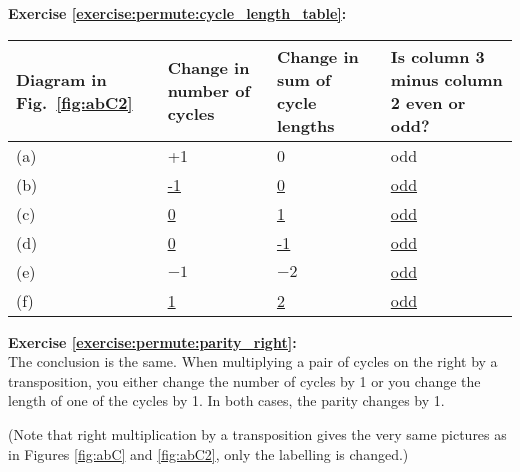 \noindent\textbf{Exercise  \ref{exercise:permute:cycle_length_table}:}
\begin{table}[!htb]
\begin{tabular}{|p{1.6cm}|p{2.7cm}|p{2.7cm}|p{3.5cm}|}
\hline 
\rule{0pt}{2.6ex} Diagram in Fig.~\ref{fig:abC2}&  Change in number of cycles   & Change in sum of cycle lengths & Is column 3 minus column 2 even or odd?  \rule[-1.2ex]{0pt}{0pt} \tabularnewline
\hline
\hline 
\rule{0pt}{2.6ex} (a)  &  +1  & 0  & odd \rule[-1.2ex]{0pt}{0pt} \tabularnewline
\hline 
\rule{0pt}{2.6ex} (b)  &  \underline{-1} & \underline{0} & \underline{odd} \rule[-1.2ex]{0pt}{0pt} \tabularnewline
\hline 
\rule{0pt}{2.6ex} (c)  &  \underline{0} & \underline{1}  & \underline{odd} \rule[-1.2ex]{0pt}{0pt} \tabularnewline
\hline 
\rule{0pt}{2.6ex} (d)  &  \underline{0} & \underline{-1}  & \underline{odd} \rule[-1.2ex]{0pt}{0pt} \tabularnewline
\hline 
\rule{0pt}{2.6ex} (e)  & $-1$ & $-2$ & \underline{odd} \rule[-1.2ex]{0pt}{0pt} \tabularnewline
\hline 
\rule{0pt}{2.6ex} (f)  &  \underline{1} & \underline{2} & \underline{odd}  \rule[-1.2ex]{0pt}{0pt} \tabularnewline
\hline 
\end{tabular}
\end{table}

\noindent\textbf{Exercise  \ref{exercise:permute:parity_right}:}\\ %
The conclusion is the same. When multiplying a pair of cycles on the right by a transposition, you either change the number of cycles by 1 or you change the length of one of the cycles by 1. In both cases, the parity changes by 1.

(Note that right multiplication by a transposition gives the very same pictures as in Figures \ref{fig:abC} and \ref{fig:abC2}, only the labelling is changed.)

